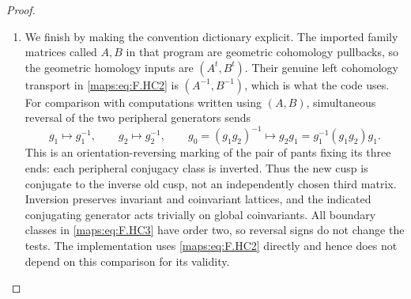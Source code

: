 \begin{proof}
\begin{enumerate}[label=\arabic*.]
\item We finish by making the convention dictionary explicit.
The imported family matrices called $A,B$ in that
program are geometric cohomology pullbacks, so the
geometric homology inputs are $(A^t,B^t)$.
Their genuine left cohomology transport in \eqref{maps:eq:F.HC2}
is $(A^{-1},B^{-1})$, which is what the code uses.
For comparison with computations written using
$(A,B)$, simultaneous reversal of the two peripheral
generators sends
\[
 g_1\mapsto g_1^{-1},\qquad
 g_2\mapsto g_2^{-1},\qquad
 g_0=(g_1g_2)^{-1}\mapsto
     g_2g_1=g_1^{-1}(g_1g_2)g_1 .
 \tag{F.HC12}\label{maps:eq:F.HC12}
\]
This is an orientation-reversing marking of the
pair of pants fixing its three ends: each peripheral
conjugacy class is inverted.
Thus the new cusp is conjugate to the inverse old
cusp, not an independently chosen third matrix.
Inversion preserves invariant and coinvariant
lattices, and the indicated conjugating generator
acts trivially on global coinvariants.
All boundary classes in \eqref{maps:eq:F.HC3} have order two, so
reversal signs do not change the tests.
The implementation uses \eqref{maps:eq:F.HC2} directly and hence
does not depend on this comparison for its validity.

\end{enumerate}
\end{proof}




